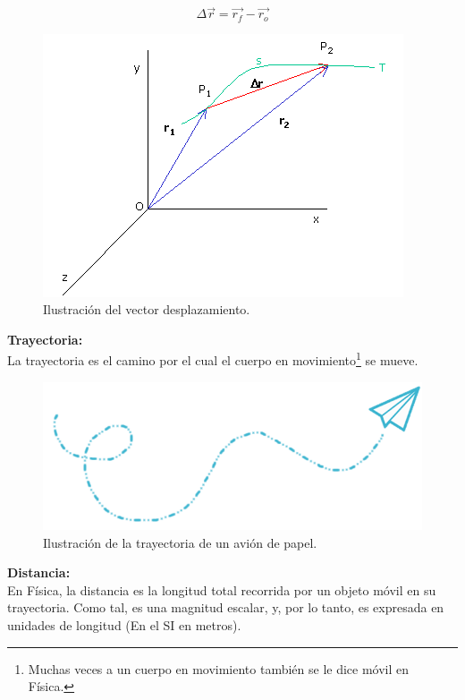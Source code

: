 \begin{equation}
 \Delta \vec{r} = \vec{r_f}-\vec{r_o}
\end{equation}

\begin{figure}[ht]
 \centering
 \includegraphics[scale=0.5]{images/cinematica.png}
 \caption{Ilustración del vector desplazamiento.}
\end{figure}

\textbf{Trayectoria:}\\

La trayectoria es el camino por el cual el cuerpo en movimiento\footnote{Muchas veces a un cuerpo en movimiento también se le 
dice móvil en Física.} se mueve.

\begin{figure}[ht]
 \centering
 \includegraphics[scale=0.4]{images/trayectoria.png}
 \caption{Ilustración de la trayectoria de un avión de papel.}
\end{figure}

\textbf{Distancia:}\\

En Física, la distancia es la longitud total recorrida por un objeto móvil en su trayectoria. Como tal, es una magnitud escalar, 
y, por lo tanto, es expresada en unidades de longitud (En el SI en metros).\\

